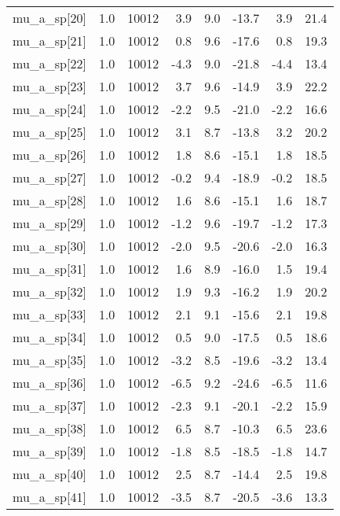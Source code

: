\documentclass{article}
\begin{document}
\begin{table}[ht]
\begin{tabular}{lrrrrrrr}
  mu\_a\_sp[20] & 1.0 & 10012 & 3.9 & 9.0 & -13.7 & 3.9 & 21.4 \\ 
  mu\_a\_sp[21] & 1.0 & 10012 & 0.8 & 9.6 & -17.6 & 0.8 & 19.3 \\ 
  mu\_a\_sp[22] & 1.0 & 10012 & -4.3 & 9.0 & -21.8 & -4.4 & 13.4 \\ 
  mu\_a\_sp[23] & 1.0 & 10012 & 3.7 & 9.6 & -14.9 & 3.9 & 22.2 \\ 
  mu\_a\_sp[24] & 1.0 & 10012 & -2.2 & 9.5 & -21.0 & -2.2 & 16.6 \\ 
  mu\_a\_sp[25] & 1.0 & 10012 & 3.1 & 8.7 & -13.8 & 3.2 & 20.2 \\ 
  mu\_a\_sp[26] & 1.0 & 10012 & 1.8 & 8.6 & -15.1 & 1.8 & 18.5 \\ 
  mu\_a\_sp[27] & 1.0 & 10012 & -0.2 & 9.4 & -18.9 & -0.2 & 18.5 \\ 
  mu\_a\_sp[28] & 1.0 & 10012 & 1.6 & 8.6 & -15.1 & 1.6 & 18.7 \\ 
  mu\_a\_sp[29] & 1.0 & 10012 & -1.2 & 9.6 & -19.7 & -1.2 & 17.3 \\ 
  mu\_a\_sp[30] & 1.0 & 10012 & -2.0 & 9.5 & -20.6 & -2.0 & 16.3 \\ 
  mu\_a\_sp[31] & 1.0 & 10012 & 1.6 & 8.9 & -16.0 & 1.5 & 19.4 \\ 
  mu\_a\_sp[32] & 1.0 & 10012 & 1.9 & 9.3 & -16.2 & 1.9 & 20.2 \\ 
  mu\_a\_sp[33] & 1.0 & 10012 & 2.1 & 9.1 & -15.6 & 2.1 & 19.8 \\ 
  mu\_a\_sp[34] & 1.0 & 10012 & 0.5 & 9.0 & -17.5 & 0.5 & 18.6 \\ 
  mu\_a\_sp[35] & 1.0 & 10012 & -3.2 & 8.5 & -19.6 & -3.2 & 13.4 \\ 
  mu\_a\_sp[36] & 1.0 & 10012 & -6.5 & 9.2 & -24.6 & -6.5 & 11.6 \\ 
  mu\_a\_sp[37] & 1.0 & 10012 & -2.3 & 9.1 & -20.1 & -2.2 & 15.9 \\ 
  mu\_a\_sp[38] & 1.0 & 10012 & 6.5 & 8.7 & -10.3 & 6.5 & 23.6 \\ 
  mu\_a\_sp[39] & 1.0 & 10012 & -1.8 & 8.5 & -18.5 & -1.8 & 14.7 \\ 
  mu\_a\_sp[40] & 1.0 & 10012 & 2.5 & 8.7 & -14.4 & 2.5 & 19.8 \\ 
  mu\_a\_sp[41] & 1.0 & 10012 & -3.5 & 8.7 & -20.5 & -3.6 & 13.3 \\ 
   \bottomrule
\end{tabular}
\end{table}
\end{document}
